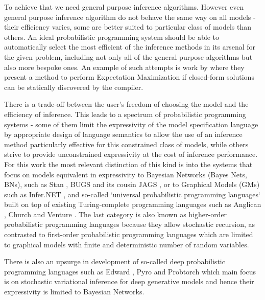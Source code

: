 \documentclass[12pt]{article}
\begin{document}

To achieve that we need general purpose inference algorithms.
However even general purpose inference algorithm do not behave the same way on all models - their efficiency varies, some are better suited to particular class of models than others.
An ideal probabilistic programming system should be able to automatically select the most efficient of the inference methods in its arsenal for the given problem, including not only all of the general purpose algorithms but also more bespoke ones.
An example of such attempts is work by \citet{ZinkovEM} where they present a method to perform Expectation Maximization \citep{EM} if closed-form solutions can be statically discovered by the compiler.

There is a trade-off between the user's freedom of choosing the model and the efficiency of inference.
This leads to a spectrum of probabilistic programming systems - some of them limit the expressivity of the model specification language by appropriate design of language semantics to allow the use of an inference method particularly effective for this constrained class of models, while others strive to provide unconstrained expressivity at the cost of inference performance.
For this work the most relevant distinction of this kind is into the systems that focus on models equivalent in expressivity to Bayesian Networks (Bayes Nets, BNs), such as Stan \citep{Stan}, BUGS \citep{WinBUGS,BUGSproject} and its cousin JAGS \citep{JAGS}, or to Graphical Models (GMs) such as Infer.NET \citep{InferNET}, and so-called `universal probabilistic programming languages` built on top of existing Turing-complete programming languages such as Anglican \citep{anglican}, Church \citep{GoodmanEtAl2008} and Venture \citep{venture}.
The last category is also known as higher-order probabilistic programming languages because they allow stochastic recursion, as contrasted to first-order probabilistic programming languages which are limited to graphical models with finite and deterministic number of random variables.

There is also an upsurge in development of so-called deep probabilistic programming languages such as Edward \citep{TranEtAl2016}, Pyro \citep{Pyro2018} and Probtorch \citep{Siddharth2017} which main focus is on stochastic variational inference for deep generative models and hence their expressivity is limited to Bayesian Networks.
\end{document}
